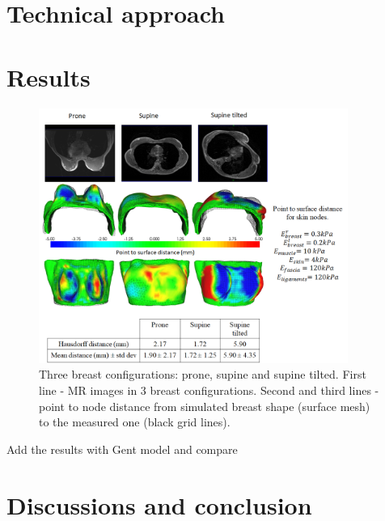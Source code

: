 
\section{Technical approach}\label{section:validation:technical approach}





\section{Results}\label{section:multi-loadinggravityvalidation}



\begin{figure}[!h]
\centering
\includegraphics[width=0.9\textwidth,keepaspectratio]{figures/modelevaluation.png} 
\caption{Three breast configurations: prone, supine and supine tilted. First line - MR images in 3 breast configurations. Second and third lines - point to node distance from simulated breast shape (surface mesh) to the measured one (black grid lines).}\label{fig:modelevaluation}
\end{figure}

{\color{darkblue} Add the results with Gent model and compare}

\section{Discussions and conclusion} \label{section:validation:discutionconclusion}
